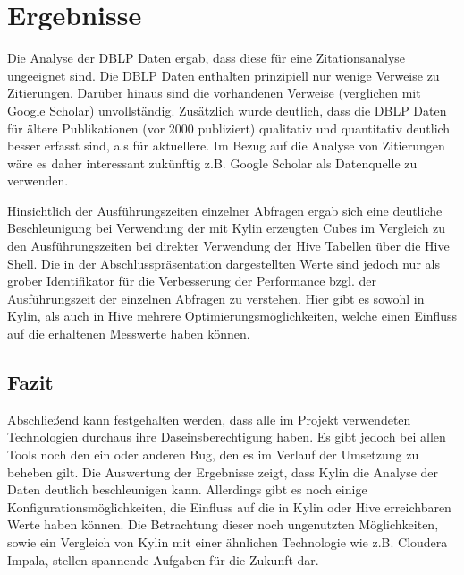 \documentclass[a4paper,11pt,utf8]{scrartcl}
\begin{document}
\section{Ergebnisse}
\label{sec:Ergebnisse}

Die Analyse der DBLP Daten ergab, dass diese für eine Zitationsanalyse ungeeignet sind. Die DBLP Daten enthalten prinzipiell nur wenige Verweise zu Zitierungen. Darüber hinaus sind die vorhandenen Verweise (verglichen mit Google Scholar) unvollständig. Zusätzlich wurde deutlich, dass die DBLP Daten für ältere Publikationen (vor 2000 publiziert) qualitativ und quantitativ deutlich besser erfasst sind, als für aktuellere. Im Bezug auf die Analyse von Zitierungen wäre es daher interessant zukünftig z.B. Google Scholar als Datenquelle zu verwenden.\medskip\par

\noindent Hinsichtlich der Ausführungszeiten einzelner Abfragen ergab sich eine deutliche Beschleunigung bei Verwendung der mit Kylin erzeugten Cubes im Vergleich zu den Ausführungszeiten bei direkter Verwendung der Hive Tabellen über die Hive Shell. Die in der Abschlusspräsentation dargestellten Werte sind jedoch nur als grober Identifikator für die Verbesserung der Performance bzgl. der Ausführungszeit der einzelnen Abfragen zu verstehen. Hier gibt es sowohl in Kylin, als auch in Hive mehrere Optimierungsmöglichkeiten, welche einen Einfluss auf die erhaltenen Messwerte haben können.

\subsection{Fazit}

Abschließend kann festgehalten werden, dass alle im Projekt verwendeten Technologien durchaus ihre Daseinsberechtigung haben. Es gibt jedoch bei allen Tools noch den ein oder anderen Bug, den es im Verlauf der Umsetzung zu beheben gilt. Die Auswertung der Ergebnisse zeigt, dass Kylin die Analyse der Daten deutlich beschleunigen kann. Allerdings gibt es noch einige Konfigurationsmöglichkeiten, die Einfluss auf die in Kylin oder Hive erreichbaren Werte haben können. Die Betrachtung dieser noch ungenutzten Möglichkeiten, sowie ein Vergleich von Kylin mit einer ähnlichen Technologie wie z.B. Cloudera Impala, stellen spannende Aufgaben für die Zukunft dar.
\end{document}
